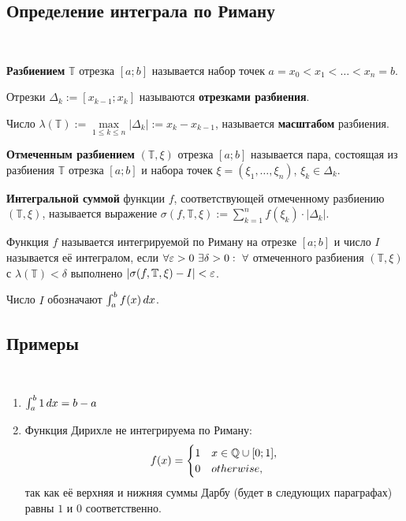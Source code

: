 \documentclass[a4paper]{article}
\theoremstyle{named}
\newcommand{\T}{\mathbb{T}}
\renewcommand{\int}{\intop}
\begin{document}
        \subsection{Определение интеграла по Риману}

        \begin{definition*}~

            \textbf{Разбиением} $\T$ отрезка $[a; b]$ называется набор точек $a = x_0 < x_1 < \dots < x_n = b$.

            Отрезки $\Delta_k := [x_{k - 1}; x_k]$ называются \textbf{отрезками разбиения}.

            Число $\lambda(\T) := \max\limits_{1 \leq k \leq n} |\Delta_k| := x_k - x_{k - 1}$, называется \textbf{масштабом} разбиения.

            \textbf{Отмеченным разбиением} $(\T, \xi)$ отрезка $[a; b]$ называется пара, состоящая из разбиения $\T$ отрезка $[a; b]$ и набора точек $\xi = (\xi_1, \dots, \xi_n)$, $\xi_k \in \Delta_k$.

            \textbf{Интегральной суммой} функции $f$, соответствующей отмеченному разбиению $(\T, \xi)$, называется выражение $\sigma(f, \T, \xi) := \sum_{k = 1}^n f(\xi_k) \cdot |\Delta_k|$.
        \end{definition*}

        \begin{definition*}
            Функция $f$ называется интегрируемой по Риману на отрезке $[a; b]$ и число $I$ называется её интегралом, если $\forall \varepsilon > 0 \ \exists \delta > 0: \ \forall$ отмеченного разбиения $(\T, \xi)$ с $\lambda(\T) < \delta$ выполнено $|\sigma(f, \T, \xi) - I| < \eps$.

            Число $I$ обозначают $\int_a^b f(x) \dd x$.
        \end{definition*}

        \subsection{Примеры}

        \begin{example*}~

            \begin{enumerate}
            \item
                $\int_a^b 1 \dd x = b - a$

            \item
                Функция Дирихле не интегрируема по Риману:
                \begin{equation*}
                	f(x) = \begin{cases}
                		1 &x \in \mathbb{Q} \cup [0; 1], \\
                		0 &otherwise,
                	\end{cases}
                \end{equation*}
                так как её верхняя и нижняя суммы Дарбу (будет в следующих параграфах) равны $1$ и $0$ соответственно.
            \end{enumerate}
        \end{example*}
\end{document}
